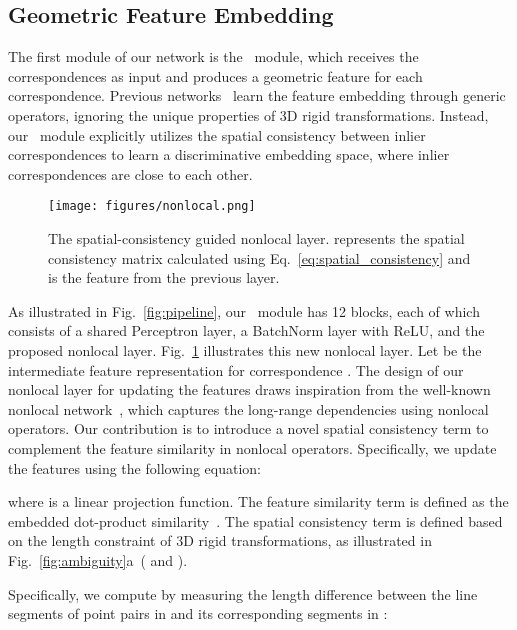 \subsection{Geometric Feature Embedding}
\label{subsec:nonlocal}

The first module of our network is the \nonlocal~module, which receives the correspondences  as input and produces a geometric feature for each correspondence. Previous networks~\cite{choy2020deep, pais20203dregnet} learn the feature embedding through generic operators,
ignoring the unique properties of 3D rigid transformations.
Instead, our \nonlocal~module explicitly utilizes the spatial consistency between inlier correspondences to learn a discriminative 
{embedding space, where inlier correspondences are close to each other.} 



\begin{figure}[t]
\setlength{\abovecaptionskip}{0.05cm}
\setlength{\belowcaptionskip}{-0.35cm}
	\vspace{-0.4cm}
	\centering
    \texttt{[image: figures/nonlocal.png]}
    \caption{The spatial-consistency guided nonlocal layer.  represents the spatial consistency matrix calculated using Eq.~\ref{eq:spatial_consistency} and  is the feature from {the} previous layer. 
}
\label{fig:nonlocal}
\end{figure}

{As illustrated in Fig.~\ref{fig:pipeline}}, our \nonlocal~module has 12 blocks, each of which consists of a shared Perceptron layer, a BatchNorm layer with ReLU, and the proposed nonlocal layer. Fig.~\ref{fig:nonlocal} {illustrates this new nonlocal layer}. Let  be the intermediate {feature} representation for correspondence . {The design of our nonlocal layer {for updating the features} draws inspiration from the well-known nonlocal network~\cite{wang2018non}, {which captures the long-range dependencies using nonlocal operators.}
Our contribution is to introduce a novel {spatial consistency term to complement the feature similarity in nonlocal operators.}
Specifically, we update the features using the following equation:  }

where  is a linear projection function. The feature similarity term  is defined as the embedded dot-product similarity~\cite{wang2018non}.
The {spatial consistency} term  {is defined based on} the {length constraint} of 3D rigid transformations, 
as illustrated in Fig.~\ref{fig:ambiguity}a~( and ). 


Specifically, we {compute}  by measuring the {length difference} {between the line segments of point pairs in  and its corresponding segments in :} 

